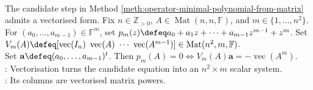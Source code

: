 \begin{perspective} \label{per:vectorized-minimal-polynomial-linear-system} \\
The candidate step in Method \ref{meth:operator-minimal-polynomial-from-matrix} admits a vectorised form. Fix $n\in\mathbb{Z}_{>0}$, $A\in\operatorname{Mat}(n,n,\mathbb{F})$, and $m\in\{1,\ldots,n^2\}$.\\
For $(a_0,\ldots,a_{m-1})\in\mathbb{F}^m$, set $p_m(z)\defeq a_0+a_1z+\cdots+a_{m-1}z^{m-1}+z^m$. Set $V_m(A)\defeq[\operatorname{vec}(I_n)\ \operatorname{vec}(A)\ \cdots\ \operatorname{vec}(A^{m-1})]\in\operatorname{Mat}(n^2,m,\mathbb{F})$.\\
Set $\mathbf{a}\defeq(a_0,\ldots,a_{m-1})^t$. Then $p_m(A)=0\iff V_m(A)\mathbf{a}=-\operatorname{vec}(A^m)$.\\
: Vectorisation turns the candidate equation into an $n^2\times m$ scalar system.\\
: Its columns are vectorised matrix powers.
\end{perspective}
